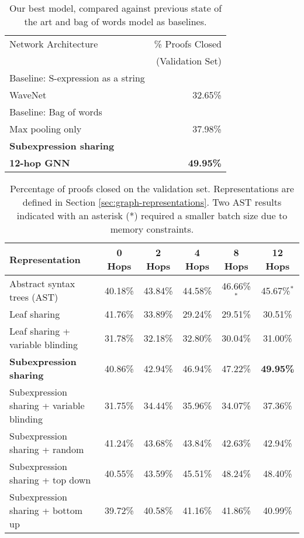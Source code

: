 \documentclass[letterpaper]{article} \usepackage{aaai20}  \usepackage{times}  \usepackage{helvet} \usepackage{courier}  \usepackage[hyphens]{url}  \usepackage{graphicx} \urlstyle{rm} \def\UrlFont{\rm}  \usepackage{graphicx}  \frenchspacing  \setlength{\pdfpagewidth}{8.5in}  \setlength{\pdfpageheight}{11in}
\newcommand{\citep}{\cite}
\begin{document}
\begin{table}
\centering
\caption{Our best model, compared against previous state of the art and bag of words model as baselines. }
    \begin{tabular}{lr}
    \hline
    Network Architecture & \% Proofs Closed \\
    & (Validation Set) \\
    \hline
    Baseline: S-expression as a string & \\
    WaveNet \citep{bansal2019holist} & 32.65\% \\
    Baseline: Bag of words & \\ 
    Max pooling only & 37.98\% \\
    \hline
    {\bf Subexpression sharing} & \\
    {\bf 12-hop GNN} & {\bf 49.95\%} \\
    \hline
\end{tabular}
\label{tab:proofs-closed-baselines}
\end{table}

\begin{table*}[t]
\centering
\caption{Percentage of proofs closed on the validation set. Representations are defined in Section \ref{sec:graph-representations}. Two AST results indicated with an asterisk (*) required a smaller batch size due to memory constraints.}
    \begin{tabular}{lccccc}
    \hline
    {\bf Representation} & {\bf 0 Hops} & {\bf 2 Hops} & {\bf 4 Hops} & {\bf 8 Hops} & {\bf 12 Hops} \\
    \hline
    Abstract syntax trees (AST) & 40.18\% & 43.84\% & 44.58\% & 46.66\%$^*$ & 45.67\%$^*$ \\
    Leaf sharing & 41.76\% & 33.89\% & 29.24\% & 29.51\% & 30.51\% \\
    Leaf sharing + variable blinding & 31.78\% & 32.18\% & 32.80\% & 30.04\% & 31.00\% \\
    {\bf Subexpression sharing} & 40.86\% & 42.94\%& 46.94\%& 47.22\% & {\bf 49.95\%} \\
    Subexpression sharing + variable blinding & 31.75\% & 34.44\% & 35.96\% & 34.07\% & 37.36\% \\
    Subexpression sharing + random & 41.24\% & 43.68\% & 43.84\% & 42.63\% & 42.94\% \\
    Subexpression sharing + top down & 40.55\% & 43.59\% & 45.51\% & 48.24\% & 48.40\% \\
    Subexpression sharing + bottom up & 39.72\% & 40.58\% & 41.16\% & 41.86\% & 40.99\% \\
    \hline
    \end{tabular}
\label{tab:proofs-closed}
\end{table*}
\end{document}

